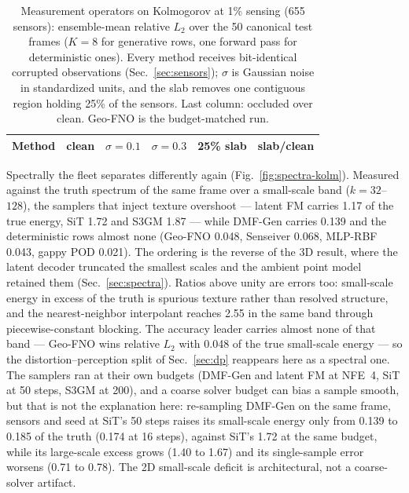 \documentclass[aip,pof,reprint,amsmath,amssymb,superscriptaddress]{revtex4-1}
\newcommand{\dmfgen}{DMF-Gen}
\begin{document}
\begin{table}[tbp]
\caption{\label{tab:operator}Measurement operators on Kolmogorov at 1\%
sensing (655 sensors): ensemble-mean relative $L_2$ over the 50 canonical test
frames ($K{=}8$ for generative rows, one forward pass for deterministic ones).
Every method receives bit-identical corrupted observations
(Sec.~\ref{sec:sensors}); $\sigma$ is Gaussian noise in standardized units, and
the slab removes one contiguous region holding 25\% of the sensors. Last
column: occluded over clean. Geo-FNO is the budget-matched run.}
\begin{ruledtabular}
\begin{tabular}{lccccc}
Method & clean & $\sigma{=}0.1$ & $\sigma{=}0.3$ & 25\% slab & slab/clean \\
\hline

\end{tabular}
\end{ruledtabular}
\end{table}

Spectrally the fleet separates differently again (Fig.~\ref{fig:spectra-kolm}).
Measured against the truth spectrum of the same frame over a small-scale band
($k = 32$--$128$), the samplers that inject texture overshoot --- latent FM
carries 1.17 of the true energy, SiT 1.72 and S3GM 1.87 --- while \dmfgen{}
carries 0.139 and the deterministic rows almost none (Geo-FNO 0.048, Senseiver
0.068, MLP-RBF 0.043, gappy POD 0.021). The ordering is the reverse of the 3D
result, where the latent decoder truncated the smallest scales and the ambient
point model retained them (Sec.~\ref{sec:spectra}). Ratios above unity are
errors too: small-scale energy in excess of the truth is spurious texture
rather than resolved structure, and the nearest-neighbor interpolant reaches
2.55 in the same band through piecewise-constant blocking. The accuracy leader
carries almost none of that band --- Geo-FNO wins relative $L_2$ with 0.048 of
the true small-scale energy --- so the distortion--perception split of
Sec.~\ref{sec:dp} reappears here as a spectral one. The samplers ran at their own budgets (\dmfgen{} and latent FM at NFE~4,
SiT at 50 steps, S3GM at 200), and a coarse solver budget can bias a sample
smooth, but that is not the explanation here: re-sampling \dmfgen{} on the same
frame, sensors and seed at SiT's 50 steps raises its small-scale energy only
from 0.139 to 0.185 of the truth (0.174 at 16 steps), against SiT's 1.72 at the
same budget, while its large-scale excess grows (1.40 to 1.67) and its
single-sample error worsens (0.71 to 0.78). The 2D small-scale deficit is
architectural, not a coarse-solver artifact.
\end{document}
